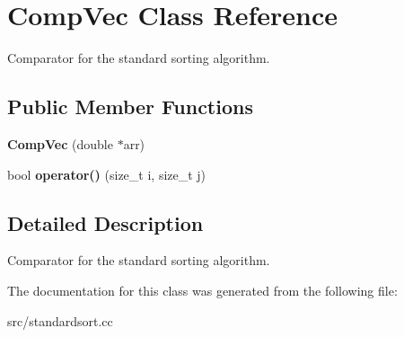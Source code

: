 \hypertarget{classCompVec}{
\section{CompVec Class Reference}
\label{d7/d1f/classCompVec}
}


Comparator for the standard sorting algorithm.  


\subsection*{Public Member Functions}
\begin{DoxyCompactItemize}
\item 
\hypertarget{classCompVec_a6963b86bb7b027c564f9fcbfa48631ff}{
{\bfseries CompVec} (double $\ast$arr)}
\label{d7/d1f/classCompVec_a6963b86bb7b027c564f9fcbfa48631ff}

\item 
\hypertarget{classCompVec_af72aba58e4ec029df30580c71c965490}{
bool {\bfseries operator()} (size\_\-t i, size\_\-t j)}
\label{d7/d1f/classCompVec_af72aba58e4ec029df30580c71c965490}

\end{DoxyCompactItemize}


\subsection{Detailed Description}
Comparator for the standard sorting algorithm. 

The documentation for this class was generated from the following file:\begin{DoxyCompactItemize}
\item 
src/standardsort.cc\end{DoxyCompactItemize}
